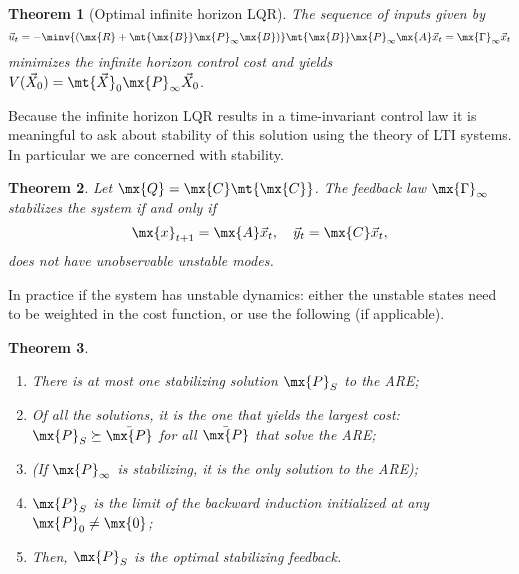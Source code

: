 \documentclass[margin=small]{hsrzf}
\newtheorem{thm}{Theorem}
\begin{document}
\begin{thm}[Optimal infinite horizon LQR]
  The sequence of inputs given by
  \[
    \vec{u}_t = -\minv{(\mx{R} + \mt{\mx{B}} \mx{P}_\infty \mx{B})}
      \mt{\mx{B}} \mx{P}_\infty \mx{A} \vec{x}_t
        = \mx{\Gamma}_\infty \vec{x}_t
  \]
  minimizes the infinite horizon control cost and yields $V(\vec{X}_0) =
  \mt{\vec{X}}_0 \mx{P}_\infty \vec{X}_0$.
\end{thm}

Because the infinite horizon LQR results in a time-invariant control law it is
meaningful to ask about stability of this solution using the theory of LTI
systems. In particular we are concerned with stability.

\begin{thm}
  Let $\mx{Q} = \mx{C}\mt{\mx{C}}$. The feedback law $\mx{\Gamma}_\infty$
  stabilizes the system if and only if
  \[
    \mx{x}_{t+1} = \mx{A} \vec{x}_t, \quad \vec{y}_t = \mx{C} \vec{x}_t,
  \]
  does not have unobservable unstable modes.
\end{thm}

In practice if the system has unstable dynamics: either the unstable states need to
be weighted in the cost function, or use the following (if applicable).

\begin{thm} \,\newline
  \begin{enumerate}
    \item There is at most one stabilizing solution $\mx{P}_S$ to the ARE;
    \item Of all the solutions, it is  the one that yields the largest cost:
      $\mx{P}_S \succeq \bar{\mx{P}}$ for all $\bar{\mx{P}}$ that solve the
      ARE;
    \item (If $\mx{P}_\infty$ is stabilizing, it is the only solution to the
      ARE);
    \item $\mx{P}_S$ is the limit of the backward induction initialized at any
      $\mx{P}_0 \neq \mx{0}$;
    \item Then, $\mx{P}_S$ is the optimal stabilizing feedback.
  \end{enumerate}
\end{thm}
\end{document}

